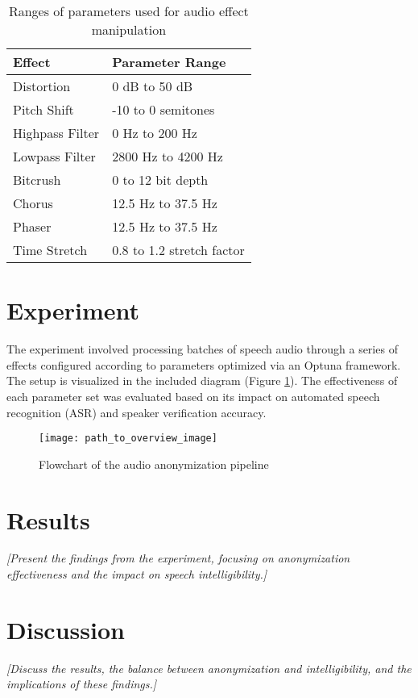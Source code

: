 \documentclass{article}
\begin{document}
    \begin{table}[h]
        \centering
        \begin{tabular}{ll}
            \toprule
            \textbf{Effect} & \textbf{Parameter Range} \\
            \midrule
            Distortion & 0 dB to 50 dB \\
            Pitch Shift & -10 to 0 semitones \\
            Highpass Filter & 0 Hz to 200 Hz \\
            Lowpass Filter & 2800 Hz to 4200 Hz \\
            Bitcrush & 0 to 12 bit depth \\
            Chorus & 12.5 Hz to 37.5 Hz \\
            Phaser & 12.5 Hz to 37.5 Hz \\
            Time Stretch & 0.8 to 1.2 stretch factor \\
            \bottomrule
        \end{tabular}
        \caption{Ranges of parameters used for audio effect manipulation}
        \label{tab:parameters}
    \end{table}

\section{Experiment}
    The experiment involved processing batches of speech audio through a series of effects configured according to parameters optimized via an Optuna framework. The setup is visualized in the included diagram (Figure \ref{fig:overview}). The effectiveness of each parameter set was evaluated based on its impact on automated speech recognition (ASR) and speaker verification accuracy.

    \begin{figure}[h]
        \centering
        \texttt{[image: path\_to\_overview\_image]}
        \caption{Flowchart of the audio anonymization pipeline}
        \label{fig:overview}
    \end{figure}

\section{Results}
    \textit{[Present the findings from the experiment, focusing on anonymization effectiveness and the impact on speech intelligibility.]}

\section{Discussion}
    \textit{[Discuss the results, the balance between anonymization and intelligibility, and the implications of these findings.]}
\end{document}
